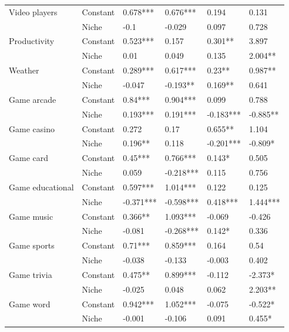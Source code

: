 \begin{longtable}[h!]{llllll}
\cline{1-6}
\multirow{2}{*}{Video players} & Constant &            0.678*** &    0.676*** &      0.194 &      0.131 \\
          & Niche &                -0.1 &      -0.029 &      0.097 &      0.728 \\
\cline{1-6}
\multirow{2}{*}{Productivity} & Constant &            0.523*** &       0.157 &    0.301** &      3.897 \\
          & Niche &                0.01 &       0.049 &      0.135 &    2.004** \\
\cline{1-6}
\multirow{2}{*}{Weather} & Constant &            0.289*** &    0.617*** &     0.23** &    0.987** \\
          & Niche &              -0.047 &    -0.193** &    0.169** &      0.641 \\
\cline{1-6}
\multirow{2}{*}{Game arcade} & Constant &             0.84*** &    0.904*** &      0.099 &      0.788 \\
          & Niche &            0.193*** &    0.191*** &  -0.183*** &   -0.885** \\
\cline{1-6}
\multirow{2}{*}{Game casino} & Constant &               0.272 &        0.17 &    0.655** &      1.104 \\
          & Niche &             0.196** &       0.118 &  -0.201*** &    -0.809* \\
\cline{1-6}
\multirow{2}{*}{Game card} & Constant &             0.45*** &    0.766*** &     0.143* &      0.505 \\
          & Niche &               0.059 &   -0.218*** &      0.115 &      0.756 \\
\cline{1-6}
\multirow{2}{*}{Game educational} & Constant &            0.597*** &    1.014*** &      0.122 &      0.125 \\
          & Niche &           -0.371*** &   -0.598*** &   0.418*** &   1.444*** \\
\cline{1-6}
\multirow{2}{*}{Game music} & Constant &             0.366** &    1.093*** &     -0.069 &     -0.426 \\
          & Niche &              -0.081 &   -0.268*** &     0.142* &      0.336 \\
\cline{1-6}
\multirow{2}{*}{Game sports} & Constant &             0.71*** &    0.859*** &      0.164 &       0.54 \\
          & Niche &              -0.038 &      -0.133 &     -0.003 &      0.402 \\
\cline{1-6}
\multirow{2}{*}{Game trivia} & Constant &             0.475** &    0.899*** &     -0.112 &    -2.373* \\
          & Niche &              -0.025 &       0.048 &      0.062 &    2.203** \\
\cline{1-6}
\multirow{2}{*}{Game word} & Constant &            0.942*** &    1.052*** &     -0.075 &    -0.522* \\
          & Niche &              -0.001 &      -0.106 &      0.091 &     0.455* \\
\end{longtable}
